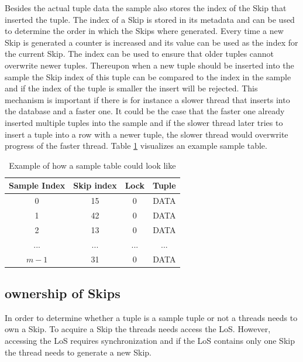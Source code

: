 \documentclass[sigconf,nonacm]{acmart}
\begin{document}
        Besides the actual tuple data the sample also stores the index of the Skip that inserted the tuple. The index of a Skip is stored in its metadata and can be used to determine the order in which the Skips where generated. Every time a new Skip is generated a counter is increased and its value can be used as the index for the current Skip.
        The index can be used to ensure that older tuples cannot overwrite newer tuples. Thereupon when a new tuple should be inserted into the sample the Skip index of this tuple can be compared to the index in the sample and if the index of the tuple is smaller the insert will be rejected. This mechanism is important if there is for instance a slower thread that inserts into the database and a faster one. It could be the case that the faster one already inserted multiple tuples into the sample and if the slower thread later tries to insert a tuple into a row with a newer tuple, the slower thread would overwrite progress of the faster thread. Table \ref{tab:sample} visualizes an example sample table.
        \begin{table}[H]
            \begin{tabular}{| c | c | c | c|} 
                \hline
                Sample Index & Skip index & Lock & Tuple \\
                \hline
                \hline
                0 & 15 & 0 & DATA \\
                \hline
                1 & 42 & 0 & DATA \\
                \hline
                2 & 13 & 0 & DATA \\
                \hline
                ... & ... & ... & ... \\
                \hline
                $m - 1$ & 31 & 0 & DATA \\
                \hline
            \end{tabular}
            \vspace{5mm}
            \caption{Example of how a sample table could look like}
            \label{tab:sample}
        \end{table}

    \subsection{ownership of Skips}
        In order to determine whether a tuple is a sample tuple or not a threads needs to own a Skip. To acquire a Skip the threads needs access the LoS. However, accessing the LoS requires synchronization and if the LoS contains only one Skip the thread needs to generate a new Skip.
        
\end{document}
